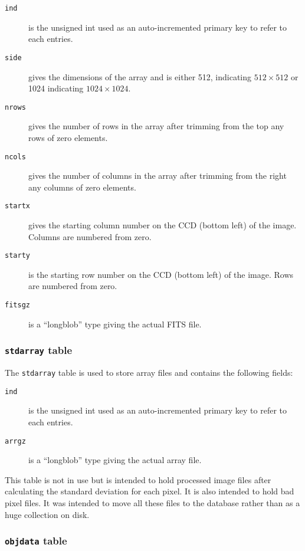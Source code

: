 \begin{description}
\item[\tt ind] is the unsigned int used as an auto-incremented primary key to
refer to each entries.
\item[\tt side] gives the dimensions of the array and is either 512, indicating
$512 \times 512$ or 1024 indicating $1024 \times 1024$.
\item[\tt nrows] gives the number of rows in the array after trimming from the
top any rows of zero elements.
\item[\tt ncols] gives the number of columns in the array after trimming from
the right any columns of zero elements.
\item[\tt startx] gives the starting column number on the CCD (bottom left) of the
image. Columns are numbered from zero.
\item[\tt starty] is the starting row number on the CCD (bottom left) of the
image. Rows are numbered from zero.
\item[\tt fitsgz] is a ``longblob'' type giving the actual FITS file.
\end{description}

\subsubsection{\texttt{stdarray} table}
\protect\label{section:stdarray}

The \texttt{stdarray} table is used to store {\numpy} array files and contains
the following fields:

\begin{description}
\item[\tt ind] is the unsigned int used as an auto-incremented primary key to
refer to each entries.
\item[\tt arrgz] is a ``longblob'' type giving the actual {\numpy} array file.
\end{description}

This table is not in use but is intended to hold processed image files after
calculating the standard deviation for each pixel. It is also intended to hold
bad pixel files. It was intended to move all these files to the database rather
than as a huge collection on disk.

\subsubsection{\texttt{objdata} table}
\protect\label{section:obsdata}

